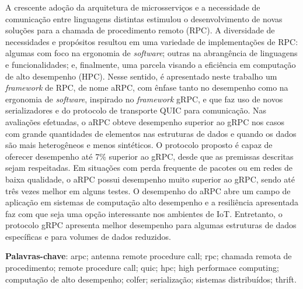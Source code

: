 \begin{resumo}
\begin{SingleSpace}
A crescente adoção da arquitetura de microsserviços e a necessidade de comunicação entre linguagens distintas estimulou o desenvolvimento de novas soluções para a chamada de procedimento remoto (RPC). A diversidade de necessidades e propósitos resultou em uma variedade de implementações de RPC: algumas com foco na ergonomia de \emph{software}; outras na abrangência de linguagens e funcionalidades; e, finalmente, uma parcela visando a eficiência em computação de alto desempenho (HPC). Nesse sentido, é apresentado neste trabalho um \emph{framework} de RPC, de nome aRPC, com ênfase tanto no desempenho como na ergonomia de \emph{software}, inspirado no \emph{framework} gRPC, e que faz uso de novos serializadores e do protocolo de transporte QUIC para comunicação. 
Nas avaliações efetuadas, o aRPC obteve desempenho superior ao gRPC nos casos com grande quantidades de elementos nas estruturas de dados e quando os dados são mais heterogêneos e menos sintéticos. O protocolo proposto é capaz de oferecer desempenho até 7\% superior ao gRPC, desde que as premissas descritas sejam respeitadas. Em situações com perda frequente de pacotes ou em redes de baixa qualidade, o aRPC possui desempenho muito superior ao gRPC, sendo até três vezes melhor em alguns testes. O desempenho do aRPC abre um campo de aplicação em sistemas de computação alto desempenho e a resiliência apresentada faz com que seja uma opção interessante nos ambientes de IoT. Entretanto, o protocolo gRPC apresenta melhor desempenho para algumas estruturas de dados específicas e para volumes de dados reduzidos. 


\end{SingleSpace}
\vspace{\onelineskip}
\textbf{Palavras-chave}: arpc; antenna remote procedure call; rpc; chamada remota de procedimento; remote procedure call; quic; hpc; high performace computing; computação de alto desempenho; colfer; serialização; sistemas distribuídos; thrift.

\end{resumo}
